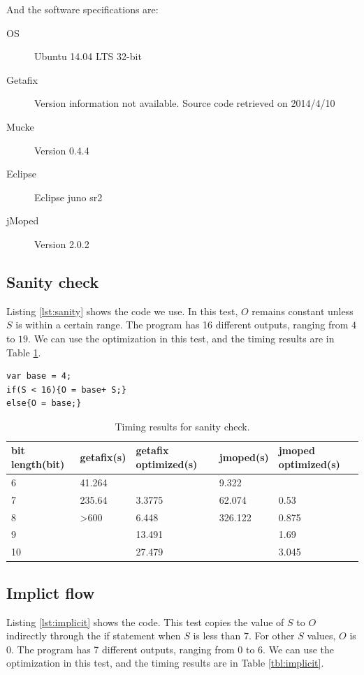 And the software specifications are:
\begin{description}
  \item[OS] Ubuntu 14.04 LTS 32-bit
  \item[Getafix] Version information not available. Source code retrieved on 2014/4/10
  \item[Mucke] Version 0.4.4
  \item[Eclipse] Eclipse juno sr2
  \item[jMoped] Version 2.0.2
\end{description}

\subsection{Sanity check}
Listing \ref{lst:sanity} shows the code we use. In this test, $O$ remains constant unless $S$ is within a certain range. The program has 16 different outputs, ranging from $4$ to $19$. We can use the optimization in this test, and the timing results are in Table \ref{tbl:sanity}.

\lstset{language=C}  
\begin{lstlisting}[caption={Sanity check test program.},label=lst:sanity]
var base = 4;
if(S < 16){O = base+ S;}
else{O = base;}
\end{lstlisting}

\begin{table}[htbp]
\begin{tabular}{|l|l|l|l|l|}
\hline
bit length(bit) & getafix(s) & getafix optimized(s) & jmoped(s) & jmoped optimized(s) \\ \hline
6 & 41.264 & {} & 9.322 & {} \\ \hline
7 & 235.64 & 3.3775 & {62.074} & 0.53 \\ \hline
8 & \textgreater 600 & 6.448 & {326.122} & 0.875 \\ \hline
9 &  & 13.491 &  & 1.69 \\ \hline
10 &  & 27.479 &  & 3.045 \\ \hline
\end{tabular}
\caption{Timing results for sanity check.}
\label{tbl:sanity}
\end{table}

\subsection{Implict flow}
Listing \ref{lst:implicit} shows the code. This test copies the value of $S$ to $O$ indirectly through the if statement when $S$ is less than $7$. For other $S$ values, $O$ is $0$. The program has 7 different outputs, ranging from $0$ to $6$. We can use the optimization in this test, and the timing results are in Table \ref{tbl:implicit}.

